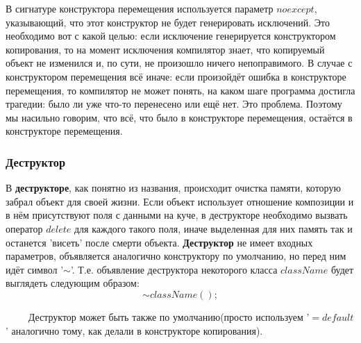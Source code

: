 \begin{notice}
    В сигнатуре конструктора перемещения используется параметр $noexcept$, указывающий, что этот конструктор не будет генерировать исключений. Это необходимо вот с какой целью: если исключение генерируется конструктором копирования, то на момент исключения компилятор знает, что копируемый объект не изменился и, по сути, не произошло ничего непоправимого. В случае с конструктором перемещения всё иначе: если произойдёт ошибка в конструкторе перемещения, то компилятор не может понять, на каком шаге программа достигла трагедии: было ли уже что-то перенесено или ещё нет. Это проблема. Поэтому мы насильно говорим, что всё, что было в конструкторе перемещения, остаётся в конструкторе перемещения.
\end{notice}

\subsubsection{Деструктор}
В \textbf{деструкторе}, как понятно из названия, происходит очистка памяти, которую забрал объект для своей жизни. Если объект использует отношение композиции и в нём присутствуют поля с данными на куче, в деструкторе необходимо вызвать оператор $delete$ для каждого такого поля, иначе выделенная для них память так и останется 'висеть' после смерти объекта.
\textbf{Деструктор} не имеет входных параметров, объявляется аналогично конструктору по умолчанию, но перед ним идёт символ '$\sim$'. Т.е. объявление деструктора некоторого класса $className$ будет выглядеть следующим образом:
$$
\sim className();
$$

$\qquad$ Деструктор может быть также по умолчанию(просто используем '$=default$' аналогично тому, как делали в конструкторе копирования).

